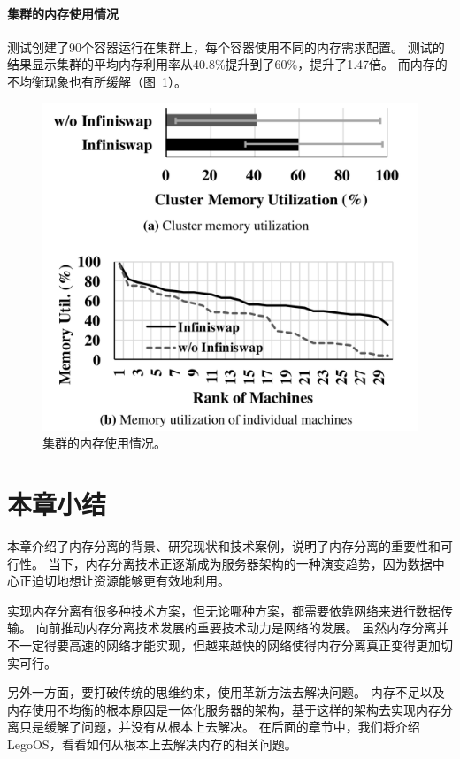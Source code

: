 \paragraph{集群的内存使用情况}
测试创建了90个容器运行在集群上，每个容器使用不同的内存需求配置。
测试的结果显示集群的平均内存利用率从40.8\%提升到了60\%，提升了1.47倍。
而内存的不均衡现象也有所缓解（图~\ref{fig:infiniswap_evaluation2}）。

\begin{figure}
\centering
\includegraphics[scale=0.3]{Figures/memory/infiniswap_evaluation2.png}
\decoRule
\caption{集群的内存使用情况\cite{gu2017efficient}。}
\label{fig:infiniswap_evaluation2}
\end{figure}



\section{本章小结}

本章介绍了内存分离的背景、研究现状和技术案例，说明了内存分离的重要性和可行性。
当下，内存分离技术正逐渐成为服务器架构的一种演变趋势，因为数据中心正迫切地想让资源能够更有效地利用。

实现内存分离有很多种技术方案，但无论哪种方案，都需要依靠网络来进行数据传输。
向前推动内存分离技术发展的重要技术动力是网络的发展。
虽然内存分离并不一定得要高速的网络才能实现，但越来越快的网络使得内存分离真正变得更加切实可行。

另外一方面，要打破传统的思维约束，使用革新方法去解决问题。
内存不足以及内存使用不均衡的根本原因是一体化服务器的架构，基于这样的架构去实现内存分离只是缓解了问题，并没有从根本上去解决。
在后面的章节中，我们将介绍LegoOS，看看如何从根本上去解决内存的相关问题。
